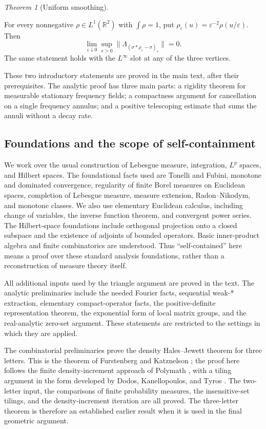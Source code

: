 \documentclass[11pt]{amsart}
\newcommand{\R}{\mathbb R}
\theoremstyle{definition}
\theoremstyle{remark}
\newtheorem{maintheorem}{Theorem}
\numberwithin{equation}{section}
\providecommand{\lean}[1]{}
\providecommand{\leanok}{}
\begin{document}
\begin{maintheorem}[Uniform smoothing]\label{intro:smoothing}
\lean{Auto.intro_smoothing}
\leanok
For every nonnegative $\rho\in L^1(\R^2)$ with $\int\rho=1$, put
$\rho_\varepsilon(u)=\varepsilon^{-2}\rho(u/\varepsilon)$.  Then
\[
 \lim_{\varepsilon\downarrow0}\sup_{s>0}
  \big\|\Lambda_{(\sigma*\rho_\varepsilon-\sigma)_s}\big\|=0.
\]
The same statement holds with the $L^\infty$ slot at any of the
three vertices.
\end{maintheorem}

These two introductory statements are proved in the main text, after
their prerequisites.  The analytic proof has three main parts: a rigidity
theorem for measurable stationary frequency fields; a compactness argument
for cancellation on a single frequency annulus; and a positive
telescoping estimate that sums the annuli without a decay rate.

\subsection*{Foundations and the scope of self-containment}

We work over the usual construction of Lebesgue measure, integration,
$L^p$ spaces, and Hilbert spaces.  The foundational facts used are
Tonelli and Fubini, monotone and dominated convergence, regularity of
finite Borel measures on Euclidean spaces, completion of Lebesgue
measure, measure extension, Radon--Nikodym, and monotone classes.
We also use elementary
Euclidean calculus, including change of variables, the inverse function
theorem, and convergent power series.  The Hilbert-space foundations
include orthogonal projection onto a closed subspace and the existence
of adjoints of bounded operators.  Basic inner-product algebra and
finite combinatorics are understood.  Thus ``self-contained'' here means
a proof over these standard analysis foundations, rather than a
reconstruction of measure theory itself.

All additional inputs used by the triangle argument are proved in the
text.  The analytic preliminaries include the needed Fourier facts,
sequential weak-* extraction, elementary compact-operator facts, the
positive-definite representation theorem, the exponential form of local
matrix groups, and the real-analytic zero-set argument.  These statements
are restricted to the settings in which they are applied.

The combinatorial preliminaries prove the density Hales--Jewett theorem
for three letters.  This is the theorem of Furstenberg and Katznelson
\cite{FK}; the proof here follows the finite density-increment approach
of Polymath \cite{Polymath}, with a tiling argument in the form developed
by Dodos, Kanellopoulos, and Tyros \cite{DKT}.  The two-letter input,
the comparisons of finite probability measures, the insensitive-set
tilings, and the density-increment iteration are all proved.  The
three-letter theorem is therefore an established earlier result when it
is used in the final geometric argument.
\end{document}
